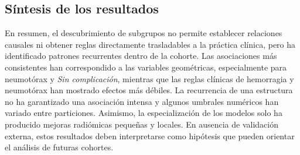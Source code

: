 





\subsection{Síntesis de los resultados}
En resumen, el descubrimiento de subgrupos no permite establecer relaciones causales ni obtener reglas directamente trasladables a la práctica clínica, pero ha identificado patrones recurrentes dentro de la cohorte. Las asociaciones más consistentes han correspondido a las variables geométricas, especialmente para neumotórax y \textit{Sin complicación}, mientras que las reglas clínicas de hemorragia y neumotórax han mostrado efectos más débiles. La recurrencia de una estructura no ha garantizado una asociación intensa y algunos umbrales numéricos han variado entre particiones. Asimismo, la especialización de los modelos solo ha producido mejoras radiómicas pequeñas y locales. En ausencia de validación externa, estos resultados deben interpretarse como hipótesis que pueden orientar el análisis de futuras cohortes.
